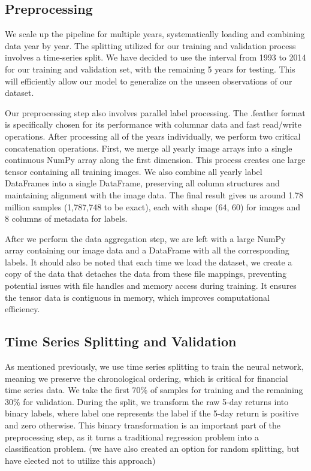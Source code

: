 \documentclass[12pt]{article}
\begin{document}
\subsection*{Preprocessing}

We scale up the pipeline for multiple years, systematically loading and combining data year by year. The splitting utilized for our training and validation process involves a time-series split. We have decided to use the interval from 1993 to 2014 for our training and validation set, with the remaining 5 years for testing. This will efficiently allow our model to generalize on the unseen observations of our dataset.

Our preprocessing step also involves parallel label processing. The .feather format is specifically chosen for its performance with columnar data and fast read/write operations. After processing all of the years individually, we perform two critical concatenation operations. First, we merge all yearly image arrays into a single continuous NumPy array along the first dimension. This process creates one large tensor containing all training images. We also combine all yearly label DataFrames into a single DataFrame, preserving all column structures and maintaining alignment with the image data. The final result gives us around 1.78 million samples (1,787,748 to be exact), each with shape (64, 60) for images and 8 columns of metadata for labels.

After we perform the data aggregation step, we are left with a large NumPy array containing our image data and a DataFrame with all the corresponding labels. It should also be noted that each time we load the dataset, we create a copy of the data that detaches the data from these file mappings, preventing potential issues with file handles and memory access during training. It ensures the tensor data is contiguous in memory, which improves computational efficiency.

\subsection*{Time Series Splitting and Validation}

As mentioned previously, we use time series splitting to train the neural network, meaning we preserve the chronological ordering, which is critical for financial time series data. We take the first 70\% of samples for training and the remaining 30\% for validation. During the split, we transform the raw 5-day returns into binary labels, where label one represents the label if the 5-day return is positive and zero otherwise. This binary transformation is an important part of the preprocessing step, as it turns a traditional regression problem into a classification problem. (we have also created an option for random splitting, but have elected not to utilize this approach)
\end{document}
